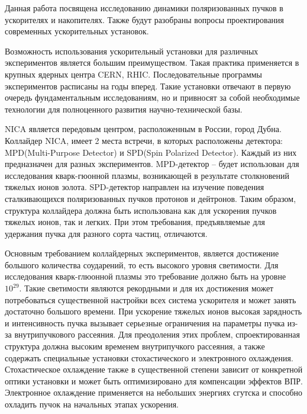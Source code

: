 \par Данная работа посвящена исследованию динамики поляризованных пучков в ускорителях и накопителях. Также будут разобраны вопросы проектирования современных ускорительных установок.

\par Возможность использования ускорительный установки для различных экспериментов является большим преимуществом. Такая практика применяется в крупных ядерных центра CERN, RHIC. Последовательные программы экспериментов расписаны на годы вперед. Такие установки отвечают в первую очередь фундаментальным исследованиям, но и привносят за собой необходимые технологии для полноценного развития научно-технической базы.

\par NICA является передовым центром, расположенным в России, город Дубна. Коллайдер NICA, имеет 2 места встречи, в которых расположены детектора: MPD(Multi-Purpose Detector) и SPD(Spin Polarized Detector). Каждый из них предназначен для разных экспериментов. MPD-детектор – будет использован для исследования кварк-гюонной плазмы, возникающей в результате столкновений тяжелых ионов золота. SPD-детектор направлен на изучение поведения сталкивающихся поляризованных пучков протонов и дейтронов. Таким образом, структура коллайдера должна быть использована как для ускорения пучков тяжелых ионов, так и легких. При этом требования, предъявляемые для удержания пучка для разного сорта частиц, отличаются. 

\par Основным требованием коллайдерных экспериментов, является достижение большого количества соударений, то есть высокого уровня светимости. Для исследования кварк-глюонной плазмы это требование должно быть на уровне $10^{29}$. Такие светимости являются рекордными и для их достижения может потребоваться существенной настройки всех система ускорителя и может занять достаточно большого времени. При ускорение тяжелых ионов высокая зарядность и интенсивность пучка вызывает серьезные ограничения на параметры пучка из-за внутрипучкового рассеяния. Для преодоления этих проблем, спроектированная структура должна высоким временем внутрипучкого рассеяния, а также содержать специальные установки стохастического и электронного охлаждения. Стохастическое охлаждение также в существенной степени зависит от конкретной оптики установки и может быть оптимизировано для компенсации эффектов ВПР. Электронное охлаждение применяется на небольших энергиях сгутска и способно охладить пучок на начальных этапах ускорения.

